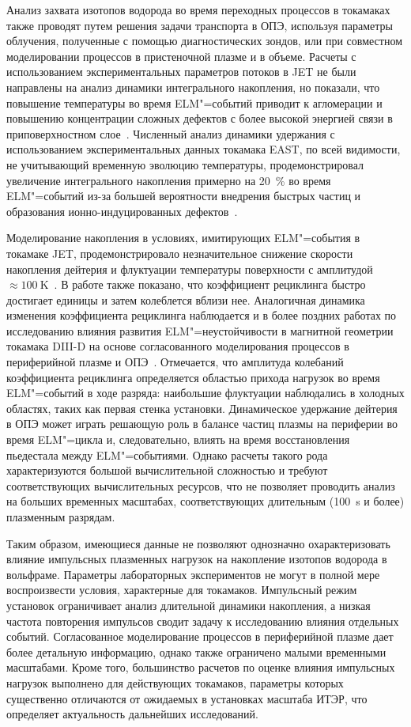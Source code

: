 Анализ захвата изотопов водорода во время переходных процессов в токамаках также проводят путем решения задачи транспорта в ОПЭ, используя параметры облучения, полученные с помощью диагностических зондов, или при совместном моделировании процессов в пристеночной плазме и в объеме. Расчеты с использованием экспериментальных параметров потоков в JET не были направлены на анализ динамики интегрального накопления, но показали, что повышение температуры во время ELM"=событий приводит к агломерации и повышению концентрации сложных дефектов с более высокой энергией связи в приповерхностном слое~\cite{Heinola2019}. Численный анализ динамики удержания с использованием экспериментальных данных токамака EAST, по всей видимости, не учитывающий временную эволюцию температуры, продемонстрировал увеличение интегрального накопления примерно на \SI{20}{\percent} во время ELM"=событий из-за большей вероятности внедрения быстрых частиц и образования ионно-индуцированных дефектов~\cite{Sang2014}.

Моделирование накопления в условиях, имитирующих ELM"=события в токамаке JET, продемонстрировало незначительное снижение скорости накопления дейтерия и флуктуации температуры поверхности с амплитудой \( \approx\SI{100}{\kelvin} \)~\cite{Schmid2016}. В работе также показано, что коэффициент рециклинга быстро достигает единицы и затем колеблется вблизи нее. Аналогичная динамика изменения коэффициента рециклинга наблюдается и в более поздних работах по исследованию влияния развития ELM"=неустойчивости в магнитной геометрии токамака DIII-D на основе согласованного моделирования процессов в периферийной плазме и ОПЭ~\cite{Smirnov2020,Lasa2024,Smirnov2024}. Отмечается, что амплитуда колебаний коэффициента рециклинга определяется областью прихода нагрузок во время ELM"=событий в ходе разряда: наибольшие флуктуации наблюдались в холодных областях, таких как первая стенка установки. Динамическое удержание дейтерия в ОПЭ может играть решающую роль в балансе частиц плазмы на периферии во время ELM"=цикла и, следовательно, влиять на время восстановления пьедестала между ELM"=событиями. Однако расчеты такого рода характеризуются большой вычислительной сложностью и требуют соответствующих вычислительных ресурсов, что не позволяет проводить анализ на больших временных масштабах, соответствующих длительным (\SI{100}{\second} и более) плазменным разрядам.

Таким образом, имеющиеся данные не позволяют однозначно охарактеризовать влияние импульсных плазменных нагрузок на накопление изотопов водорода в вольфраме. Параметры лабораторных экспериментов не могут в полной мере воспроизвести условия, характерные для токамаков. Импульсный режим установок ограничивает анализ длительной динамики накопления, а низкая частота повторения импульсов сводит задачу к исследованию влияния отдельных событий. Согласованное моделирование процессов в периферийной плазме дает более детальную информацию, однако также ограничено малыми временными масштабами. Кроме того, большинство расчетов по оценке влияния импульсных нагрузок выполнено для действующих токамаков, параметры которых существенно отличаются от ожидаемых в установках масштаба ИТЭР, что определяет актуальность дальнейших исследований.


